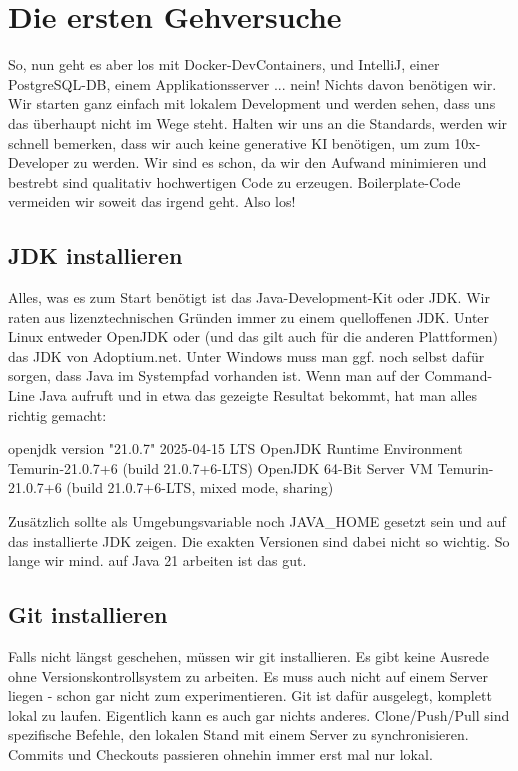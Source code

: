 \section{Die ersten Gehversuche}
So, nun geht es aber los mit Docker-DevContainers, und IntelliJ, einer 
PostgreSQL-DB, einem Applikationsserver ... nein! Nichts davon benötigen wir.
Wir starten ganz einfach mit lokalem Development und werden sehen, dass uns
das überhaupt nicht im Wege steht. Halten wir uns an die Standards, werden
wir schnell bemerken, dass wir auch keine generative KI benötigen, um zum 
10x-Developer zu werden. Wir sind es schon, da wir den Aufwand minimieren
und bestrebt sind qualitativ hochwertigen Code zu erzeugen. Boilerplate-Code
vermeiden wir soweit das irgend geht. Also los!

\subsection{JDK installieren}
Alles, was es zum Start benötigt ist das Java-Development-Kit oder JDK. Wir
raten aus lizenztechnischen Gründen immer zu einem quelloffenen JDK. Unter
Linux entweder OpenJDK oder (und das gilt auch für die anderen Plattformen)
das JDK von Adoptium.net. Unter Windows muss man ggf. noch selbst dafür sorgen,
dass Java im Systempfad vorhanden ist. Wenn man auf der Command-Line Java
aufruft und in etwa das gezeigte Resultat bekommt, hat man alles richtig
gemacht:
\begin{terminalbox}
\begin{VerbatimBreak}
openjdk version "21.0.7" 2025-04-15 LTS
OpenJDK Runtime Environment Temurin-21.0.7+6 (build 21.0.7+6-LTS)
OpenJDK 64-Bit Server VM Temurin-21.0.7+6 (build 21.0.7+6-LTS, mixed mode, sharing)
\end{VerbatimBreak}
\end{terminalbox}

Zusätzlich sollte als Umgebungsvariable noch JAVA\_HOME gesetzt sein und auf das
installierte JDK zeigen. Die exakten Versionen sind dabei nicht so wichtig.
So lange wir mind. auf Java 21 arbeiten ist das gut.

\subsection{Git installieren}
Falls nicht längst geschehen, müssen wir git installieren. Es gibt keine 
Ausrede ohne
Versionskontrollsystem zu arbeiten. Es muss auch nicht auf einem Server liegen
- schon gar nicht zum experimentieren. Git ist dafür ausgelegt, komplett lokal
zu laufen. Eigentlich kann es auch gar nichts anderes. Clone/Push/Pull sind 
spezifische
Befehle, den lokalen Stand mit einem Server zu synchronisieren. Commits und 
Checkouts passieren ohnehin immer erst mal nur lokal. 

